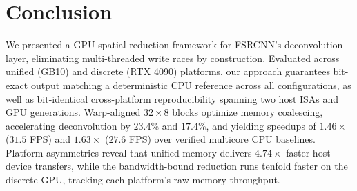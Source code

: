 \documentclass[conference]{IEEEtran}
\begin{document}
\section{Conclusion}
We presented a GPU spatial-reduction framework for FSRCNN's deconvolution layer, eliminating multi-threaded write races by construction. Evaluated across unified (GB10) and discrete (RTX 4090) platforms, our approach guarantees bit-exact output matching a deterministic CPU reference across all configurations, as well as bit-identical cross-platform reproducibility spanning two host ISAs and GPU generations. Warp-aligned $32{\times}8$ blocks optimize memory coalescing, accelerating deconvolution by $23.4\%$ and $17.4\%$, and yielding speedups of $1.46\times$ ($31.5$ FPS) and $1.63\times$ ($27.6$ FPS) over verified multicore CPU baselines. Platform asymmetries reveal that unified memory delivers $4.74\times$ faster host-device transfers, while the bandwidth-bound reduction runs tenfold faster on the discrete GPU, tracking each platform's raw memory throughput.
\end{document}
